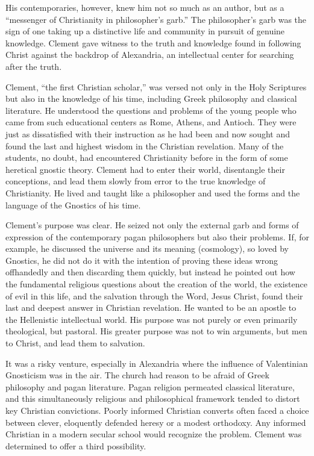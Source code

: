 His contemporaries, however, knew him not so much as an author, but as a “messenger of Christianity
in philosopher’s garb.” The philosopher’s garb was the sign of one taking up a distinctive life and
community in pursuit of genuine knowledge. Clement gave witness to the truth and knowledge found in
following Christ against the backdrop of Alexandria, an intellectual center for searching after the
truth.

Clement, “the first Christian scholar,” was versed not only in the Holy Scriptures but also in the
knowledge of his time, including Greek philosophy and classical literature. He understood the
questions and problems of the young people who came from such educational centers as Rome, Athens,
and Antioch. They were just as dissatisfied with their instruction as he had been and now sought and
found the last and highest wisdom in the Christian revelation. Many of the students, no doubt, had
encountered Christianity before in the form of some heretical gnostic theory. Clement had to enter
their world, disentangle their conceptions, and lead them slowly from error to the true knowledge of
Christianity. He lived and taught like a philosopher and used the forms and the language of the
Gnostics of his time.

Clement’s purpose was clear. He seized not only the external garb and forms of expression of the
contemporary pagan philosophers but also their problems. If, for example, he discussed the universe
and its meaning (cosmology), so loved by Gnostics, he did not do it with the intention of proving
these ideas wrong offhandedly and then discarding them quickly, but instead he pointed out how the
fundamental religious questions about the creation of the world, the existence of evil in this life,
and the salvation through the Word, Jesus Christ, found their last and deepest answer in Christian
revelation. He wanted to be an apostle to the Hellenistic intellectual world. His purpose was not
purely or even primarily theological, but pastoral. His greater purpose was not to win arguments,
but men to Christ, and lead them to salvation.

It was a risky venture, especially in Alexandria where the influence of Valentinian Gnosticism was
in the air. The church had reason to be afraid of Greek philosophy and pagan literature. Pagan
religion permeated classical literature, and this simultaneously religious and philosophical
framework tended to distort key Christian convictions. Poorly informed Christian converts often
faced a choice between clever, eloquently defended heresy or a modest orthodoxy. Any informed
Christian in a modern secular school would recognize the problem. Clement was determined to offer a
third possibility.

